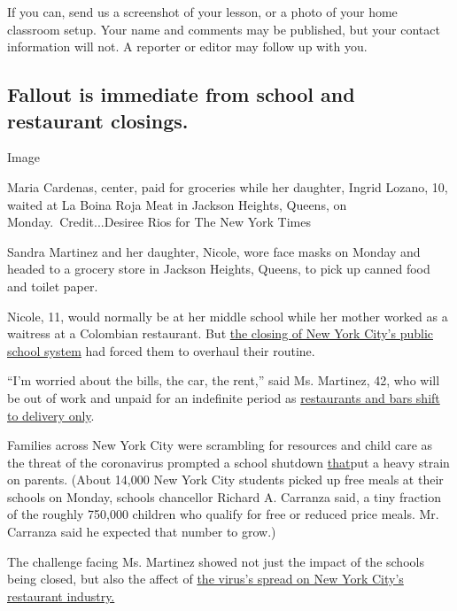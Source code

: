 If you can, send us a screenshot of your lesson, or a photo of your home
classroom setup. Your name and comments may be published, but your
contact information will not. A reporter or editor may follow up with
you.

\subsection{}

\hypertarget{fallout-is-immediate-from-school-and-restaurant-closings}{%
\subsection{Fallout is immediate from school and restaurant
closings.}\label{fallout-is-immediate-from-school-and-restaurant-closings}}

Image

Maria Cardenas, center, paid for groceries while her daughter, Ingrid
Lozano, 10, waited at La Boina Roja Meat in Jackson Heights, Queens, on
Monday.~Credit...Desiree Rios for The New York Times

Sandra Martinez and her daughter, Nicole, wore face masks on Monday and
headed to a grocery store in Jackson Heights, Queens, to pick up canned
food and toilet paper.

Nicole, 11, would normally be at her middle school while her mother
worked as a waitress at a Colombian restaurant. But
\href{https://www.nytimes.com/2020/03/15/nyregion/nyc-schools-closed.html}{the
closing of New York City's public school system} had forced them to
overhaul their routine.

``I'm worried about the bills, the car, the rent,'' said Ms. Martinez,
42, who will be out of work and unpaid for an indefinite period as
\href{https://www.nytimes.com/2020/03/15/nyregion/coronavirus-nyc-shutdown.html}{restaurants
and bars shift to delivery only}.

Families across New York City were scrambling for resources and child
care as the threat of the coronavirus prompted a school shutdown
\href{https://www.nytimes.com/2020/03/16/nyregion/nyc-schools-closed-coronavirus.html}{that}put
a heavy strain on parents. (About 14,000 New York City students picked
up free meals at their schools on Monday, schools chancellor Richard A.
Carranza said, a tiny fraction of the roughly 750,000 children who
qualify for free or reduced price meals. Mr. Carranza said he expected
that number to grow.)

The challenge facing Ms. Martinez showed not just the impact of the
schools being closed, but also the affect of
\href{https://www.nytimes.com/2020/03/16/nyregion/nyc-closing-bars-restaurants-coronavirus.html}{the
virus's spread on New York City's restaurant industry.}

